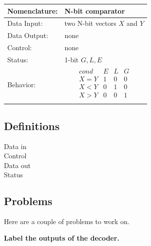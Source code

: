 \begin{tabular}{|l|p{3.5in}|} \hline
Nomenclature:  & N-bit comparator                \\ \hline
Data Input:    & two N-bit vectors $X$ and $Y$           \\ \hline  
Data Output:   & none               \\ \hline
Control:       & none                      \\ \hline
Status:        & 1-bit $G,L,E$ \\ \hline
Behavior:      & 
		$$\begin{array}{l|l|l|l}
      			cond  & E & L & G \\ \hline
			X = Y & 1 & 0 & 0 \\ \hline
			X < Y & 0 & 1 & 0 \\ \hline
			X > Y & 0 & 0 & 1 \\
		\end{array}$$			\\ \hline
\end{tabular}



\subsection{Definitions}
\begin{description}
\item [Data in]
\item [Control]
\item [Data out]
\item [Status]
\end{description}


\subsection{Problems}
Here are a couple of problems to work on.

{\bf Label the outputs of the decoder.}

